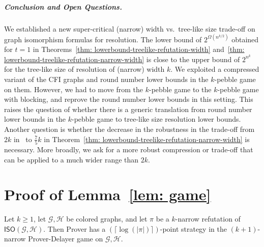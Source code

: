 \documentclass[a4paper,english, thm-restate]{lipics-v2021}
\newcommand{\graphG}{\mathcal{G}}
\newcommand{\graphH}{\mathcal{H}}
\newcommand{\ISO}{\mathsf{ISO}(\graphG, \graphH)}
\begin{document}
\subparagraph{Conclusion and Open Questions.}
We established a new super-critical (narrow) width vs.~tree-like size trade-off on graph isomorphism formulas for resolution. The lower bound of $2^{\Omega(n^{k/2})}$ obtained for $t=1$ in Theorems~\ref{thm: lowerbound-treelike-refutation-width} and~\ref{thm: lowerbound-treelike-refutation-narrow-width} is close to the upper bound of $2^{n^k}$ for the tree-like size of resolution of (narrow) width $k$.
We exploited a compressed variant of the CFI graphs and round number lower bounds in the $k$-pebble game on them. However, we had to move from the $k$-pebble game to the $k$-pebble game with blocking, and reprove the round number lower bounds in this setting. This raises the question of whether there is a generic translation from round number lower bounds in the $k$-pebble game to tree-like size resolution lower bounds.
Another question is whether the decrease in the robustness in the trade-off from $2k$ in~\cite{RFJN024} to $\frac{7}{5}k$ in Theorem~\ref{thm: lowerbound-treelike-refutation-narrow-width} is necessary.
More broadly, we ask for a more robust compression or trade-off that can be applied to a much wider range than $2k$.
         
        
        
        
        \newpage

        
        
        \newpage
\appendix

%
\section{Proof of Lemma~\ref{lem: game}} \label{a: prover_delayer}

\begin{lemma}
Let $k\ge 1$, let $\graphG, \graphH$ be colored graphs, and let $\pi$ be a $k$-narrow refutation of $\ISO$. Then Prover has a $(\lceil \log(|\pi|)  \rceil)$-point strategy in the $(k+1)$-narrow Prover-Delayer game on $\graphG,\graphH$. 
\end{lemma}
\end{document}
